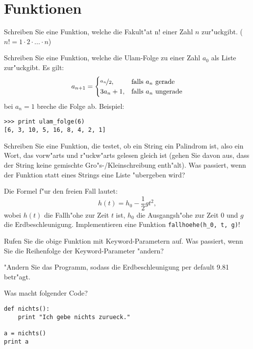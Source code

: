 \section*{Funktionen}
\begin{aufgabe}[Fakult"at]
\label{fakultaet}
Schreiben Sie eine Funktion, welche die Fakult"at n! einer Zahl $n$ zur"uckgibt. ($n! = 1 \cdot 2 \cdot ... \cdot n$)
\end{aufgabe}

\begin{aufgabe}
\label{ulamfolge}
Schreiben Sie eine Funktion, welche die Ulam-Folge zu einer Zahl $a_0$ als Liste zur"uckgibt. Es gilt: 
\begin{displaymath}
a_{n+1} =
\begin{cases}
\nicefrac{a_n}{2}, & \text{falls } a_n \text{ gerade}\\
3 a_n+1, & \text{falls } a_n \text{ ungerade}\\
\end{cases}
\end{displaymath}
 bei $a_n=1$ breche die Folge ab. 
Beispiel: 
\begin{lstlisting}
>>> print ulam_folge(6)
[6, 3, 10, 5, 16, 8, 4, 2, 1]
\end{lstlisting}
\end{aufgabe}

\begin{aufgabe}[Palindrom]
\label{palindrom}
Schreiben Sie eine Funktion, die testet, ob ein String ein Palindrom ist, also ein Wort, das vorw"arts und r"uckw"arts gelesen gleich ist (gehen Sie davon aus, dass der String keine gemischte Gro"s-/Kleinschreibung enth"alt). Was passiert, wenn der Funktion statt eines Strings eine Liste "ubergeben wird? 
\end{aufgabe}

\begin{aufgabe}
\label{freier_fall}
Die Formel f"ur den freien Fall lautet: 
\begin{displaymath}
h(t) = h_0 - \frac{1}{2} gt^2, 
\end{displaymath}
wobei $h(t)$ die Fallh"ohe zur Zeit $t$ ist, $h_0$ die Ausgangsh"ohe zur Zeit 0 und $g$ die Erdbeschleunigung. Implementieren eine Funktion \lstinline{fallhoehe(h_0, t, g)}!
\begin{teilaufgabe}
Rufen Sie die obige Funktion mit Keyword-Parametern auf. Was passiert, wenn Sie die Reihenfolge der Keyword-Parameter "andern?
\end{teilaufgabe}
\begin{teilaufgabe}
"Andern Sie das Programm, sodass die Erdbeschleunigung per default 9.81 betr"agt.
\end{teilaufgabe}
\end{aufgabe}

\begin{aufgabe}
Was macht folgender Code?\\
\begin{lstlisting}
def nichts():
    print "Ich gebe nichts zurueck."

a = nichts()
print a
\end{lstlisting}
\end{aufgabe}


